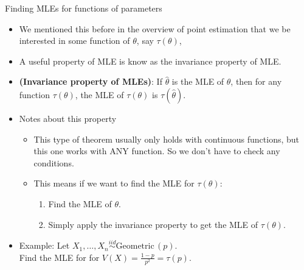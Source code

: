 \documentclass{article}
\newcommand{\vecn}[2]{#1_1, \ldots, #1_{#2}}	%
\newcommand{\followsp}[2]{\overset{#1}\sim \text{#2}\,}		%
\begin{document}
Finding MLEs for functions of parameters\bigskip
\begin{itemize}
    \item We mentioned this before in the overview of point estimation that we be interested in some function of $\theta$, say $\tau(\theta)$, 
    \item[] A useful property of MLE is know as the invariance property of MLE.
    \item \textbf{(Invariance property of MLEs)}: If $\hat{\theta}$ is the MLE of $\theta$, then for any function $\tau(\theta)$, the MLE of $\tau(\theta)$ is $\tau(\hat\theta)$.
    \item Notes about this property
    \begin{itemize}
        \item This type of theorem usually only holds with continuous functions, but this one works with ANY function. So we don't have to check any conditions.
        \item This means if we want to find the MLE for $\tau(\theta)$:
        \begin{enumerate}
            \item Find the MLE of $\theta$.
            \item Simply apply the invariance property to get the MLE of $\tau(\theta)$.
        \end{enumerate}
    \end{itemize}\bigskip
    \item Example: Let $\vecn{X}{n} \followsp{iid}{Geometric}(p)$. \\Find the MLE for for $\displaystyle V(X) = \frac{1 - p}{p^2} = \tau(p) $.\vspace{40pt}
\end{itemize}\bigskip
\end{document}

